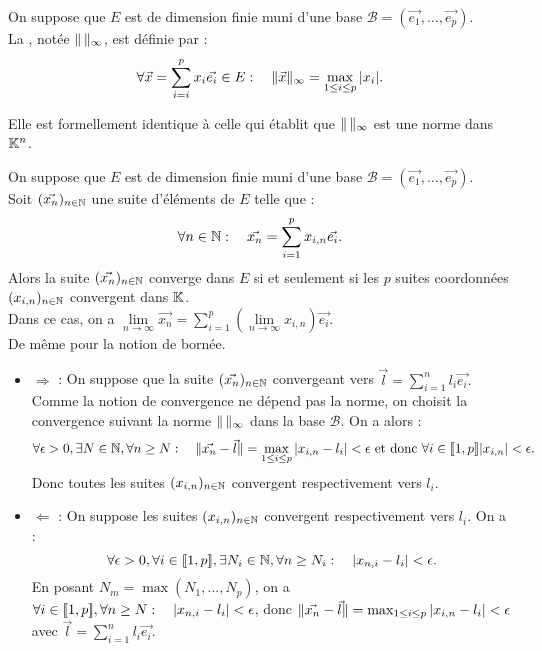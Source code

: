\documentclass{book}
\begin{document}
\begin{DefinitionProposition}
On suppose que $E$ est de dimension finie muni d'une base $\mathcal{B} = (\vec{e_1}, \dots, \vec{e_p})$.\\
La , notée $\mathopen\lVert \, \mathclose\rVert_\infty$, est  définie par :
$$\forall \vec{x}=\sum_{i=i}^p x_i\vec{e_i} \in  E:\quad \mathopen\lVert \vec{x} \mathclose\rVert_\infty=\max_{1\leq i\leq p}|x_i|.$$ 
\end{DefinitionProposition}
\begin{Demonstration}
Elle est formellement identique à celle qui établit que $\mathopen\lVert \, \mathclose\rVert_{\infty}$ est une norme dans $\mathbb{K}^n$.
\end{Demonstration}
\begin{Proposition}
On suppose que $E$ est de dimension finie muni d'une base $\mathcal{B} = (\vec{e_1}, \dots, \vec{e_p})$.\\
Soit $(\vec{x_n})_{n\in\mathbb{N}}$ une suite d'éléments de $E$ telle que : 
$$\forall  n\in\mathbb{N} : \quad \vec{x_n} = \sum_{i=1}^p x_{i,n} \vec{e_i}.$$
Alors la suite $(\vec{x_n})_{n\in\mathbb{N}}$ converge dans $E$ si et seulement si les $p$ suites coordonnées $(x_{i,n})_{n\in\mathbb{N}}$ convergent dans $\mathbb{K}$.\\
Dans ce cas, on a $\lim\limits_{n\to\infty} \vec{x_n} = \sum_{i=1}^p (\lim\limits_{n\to\infty}x_{i,n}) \vec{e_i}.$\\
De même pour la notion de bornée.
\end{Proposition}
\begin{Demonstration}
\begin{itemize}
\item $\Longrightarrow$ : On suppose que la suite $(\vec{x_n})_{n\in\mathbb{N}}$ convergeant vers  $\vec{l}=\sum_{i=1}^n l_i \vec{e_i}.$ Comme la notion de convergence ne dépend pas la norme, on choisit la convergence suivant la norme $\mathopen\lVert \, \mathclose\rVert_\infty$ dans la base $\mathcal{B}$. On a alors :
$$\forall \epsilon >0,\exists N\in \mathbb{N}, \forall n\geq N:\quad \mathopen\lVert \vec{x_n}-\vec{l} \mathclose\rVert=\max_{1 \leq i \leq p }|x_{i,n}-l_i|<\epsilon \text{ et donc }\forall i\in\mathopen\lbrack\!\lbrack1,p \mathclose\rbrack\!\rbrack|x_{i,n}|<\epsilon.$$
Donc toutes les suites $(x_{i,n})_{n\in\mathbb{N}}$ convergent respectivement vers $l_i$.
\item $\Longleftarrow$ : On suppose les suites $(x_{i,n})_{n\in\mathbb{N}}$ convergent respectivement vers $l_i$. On a :
$$\forall \epsilon >0, \forall i\in\mathopen\lbrack\!\lbrack1,p \mathclose\rbrack\!\rbrack,\exists N_i\in \mathbb{N}, \forall n\geq N_i:\quad |x_{n,i}-l_i|<\epsilon.$$
En posant $N_m=\max(N_1,\dots,N_p)$, on a   $\forall i\in\mathopen\lbrack\!\lbrack1,p \mathclose\rbrack\!\rbrack, \forall n\geq N:\quad |x_{n,i}-l_i|<\epsilon$, donc $\mathopen\lVert \vec{x_n}-\vec{l} \mathclose\rVert=\max_{1 \leq i \leq p }|x_{i,n}-l_i|<\epsilon$ avec $\vec{l}=\sum_{i=1}^n l_i \vec{e_i}$.
\end{itemize}
\end{Demonstration}
\end{document}
